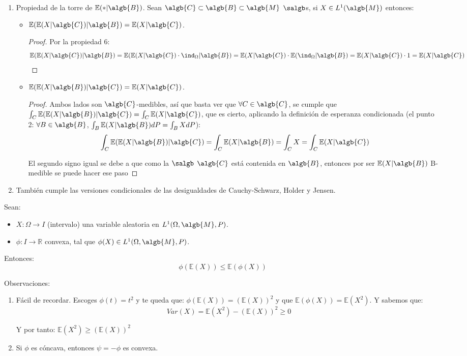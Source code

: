 \documentclass{apuntes}
\begin{document}
\begin{enumerate}
\item Propiedad de la torre de $\mathbb{E}(*|\algb{B})$. Sean $\algb{C} \subset \algb{B} \subset \algb{M}$ $\salgb$s, si $X \in L^ 1(\algb{M})$ entonces:
\begin{itemize}
\item $\mathbb{E}(\mathbb{E}(X|\algb{C})|\algb{B}) = \mathbb{E}(X|\algb{C})$.
\begin{proof}
Por la propiedad 6:
\[
\mathbb{E}(\mathbb{E}(X|\algb{C})|\algb{B}) = \mathbb{E}(\mathbb{E}(X|\algb{C}) \cdot \ind_{\Omega}|\algb{B}) = \mathbb{E}(X|\algb{C}) \cdot \mathbb{E}(\ind_{\Omega}|\algb{B}) = \mathbb{E}(X|\algb{C}) \cdot 1 = \mathbb{E}(X|\algb{C})
\]
\end{proof}
\item $\mathbb{E}(\mathbb{E}(X|\algb{B})|\algb{C}) = \mathbb{E}(X|\algb{C})$.
\begin{proof}
Ambos lados son $\algb{C}$-medibles, así que basta ver que $\forall C \in \algb{C}$, se cumple que $\int_C \mathbb{E}(\mathbb{E}(X|\algb{B})|\algb{C}) = \int_C \mathbb{E}(X|\algb{C})$, que es cierto, aplicando la definición de esperanza condicionada (el punto 2: $\forall B \in \algb{B}$, $\int_{B}\mathbb{E}(X|\algb{B})dP=\int_{B}XdP$):
\[
\int_C \mathbb{E}(\mathbb{E}(X|\algb{B})|\algb{C}) = \int_C \mathbb{E}(X|\algb{B}) = \int_C X = \int_C \mathbb{E}(X|\algb{C})
\] 

El segundo signo igual se debe a que como la $\salgb$ $\algb{C}$ está contenida en $\algb{B}$, entonces por ser $\mathbb{E}(X|\algb{B})$ B-medible se puede hacer ese paso

\end{proof}
\end{itemize}
\item También cumple las versiones condicionales de las desigualdades de Cauchy-Schwarz, Holder y Jensen.
\end{enumerate}

\begin{defn}
Sean:
\begin{itemize}
\item $X: \Omega \rightarrow I$ (intervalo) una variable aleatoria en $L^1(\Omega, \algb{M},P)$.
\item $\phi: I \rightarrow \mathbb{R}$ convexa, tal que $\phi(X) \in L^1(\Omega,\algb{M},P)$.
\end{itemize}
Entonces:
\[
\phi(\mathbb{E}(X)) \leq \mathbb{E}(\phi(X))
\]

Observaciones:
\begin{enumerate}
\item Fácil de recordar. Escoges $\phi(t)=t^2$ y te queda que: $\phi(\mathbb{E}(X))=(\mathbb{E}(X))^2$ y que  $\mathbb{E}(\phi(X)) = \mathbb{E}(X^2)$. Y sabemos que:
\[
Var(X) = \mathbb{E}(X^2) - (\mathbb{E}(X))^2 \geq 0
\]

Y por tanto: $\mathbb{E}(X^2) \geq (\mathbb{E}(X))^2$
\item Si $\phi$ es cóncava, entonces $\psi = -\phi$ es convexa.
\end{enumerate}
\end{defn}
\end{document}
